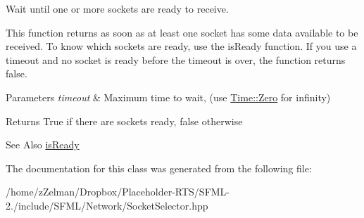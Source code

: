 Wait until one or more sockets are ready to receive. 

This function returns as soon as at least one socket has some data available to be received. To know which sockets are ready, use the is\-Ready function. If you use a timeout and no socket is ready before the timeout is over, the function returns false.


\begin{DoxyParams}{Parameters}
{\em timeout} & Maximum time to wait, (use \hyperlink{classsf_1_1Time_a8db127b632fa8da21550e7282af11fa0}{Time\-::\-Zero} for infinity)\\
\hline
\end{DoxyParams}
\begin{DoxyReturn}{Returns}
True if there are sockets ready, false otherwise
\end{DoxyReturn}
\begin{DoxySeeAlso}{See Also}
\hyperlink{classsf_1_1SocketSelector_a8e67b463db05eadb4d356992c896833c}{is\-Ready} 
\end{DoxySeeAlso}


The documentation for this class was generated from the following file\-:\begin{DoxyCompactItemize}
\item 
/home/z\-Zelman/\-Dropbox/\-Placeholder-\/\-R\-T\-S/\-S\-F\-M\-L-\/2./include/\-S\-F\-M\-L/\-Network/Socket\-Selector.\-hpp\end{DoxyCompactItemize}
